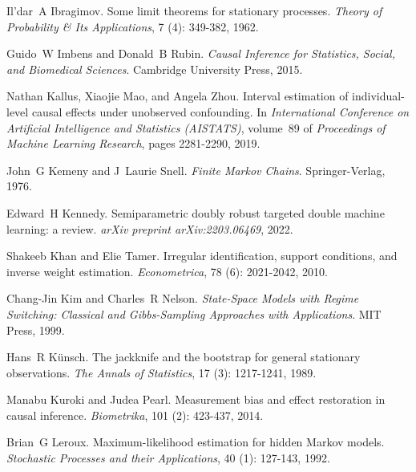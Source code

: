 Il'dar~A Ibragimov.
\newblock Some limit theorems for stationary processes.
\newblock \emph{Theory of Probability \& Its Applications}, 7 (4): 349-382, 1962.

Guido~W Imbens and Donald~B Rubin.
\newblock \emph{Causal Inference for Statistics, Social, and Biomedical Sciences}.
\newblock Cambridge University Press, 2015.

Nathan Kallus, Xiaojie Mao, and Angela Zhou.
\newblock Interval estimation of individual-level causal effects under unobserved confounding.
\newblock In \emph{International Conference on Artificial Intelligence and Statistics (AISTATS)}, volume~89 of \emph{Proceedings of Machine Learning Research}, pages 2281-2290, 2019.

John~G Kemeny and J~Laurie Snell.
\newblock \emph{Finite Markov Chains}.
\newblock Springer-Verlag, 1976.

Edward~H Kennedy.
\newblock Semiparametric doubly robust targeted double machine learning: a review.
\newblock \emph{arXiv preprint arXiv:2203.06469}, 2022.

Shakeeb Khan and Elie Tamer.
\newblock Irregular identification, support conditions, and inverse weight estimation.
\newblock \emph{Econometrica}, 78 (6): 2021-2042, 2010.

Chang-Jin Kim and Charles~R Nelson.
\newblock \emph{State-Space Models with Regime Switching: Classical and Gibbs-Sampling Approaches with Applications}.
\newblock MIT Press, 1999.

Hans~R K{\"u}nsch.
\newblock The jackknife and the bootstrap for general stationary observations.
\newblock \emph{The Annals of Statistics}, 17 (3): 1217-1241, 1989.

Manabu Kuroki and Judea Pearl.
\newblock Measurement bias and effect restoration in causal inference.
\newblock \emph{Biometrika}, 101 (2): 423-437, 2014.

Brian~G Leroux.
\newblock Maximum-likelihood estimation for hidden {M}arkov models.
\newblock \emph{Stochastic Processes and their Applications}, 40 (1): 127-143, 1992.

